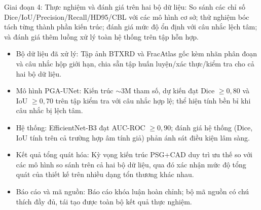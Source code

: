 Giai đoạn 4: Thực nghiệm và đánh giá trên hai bộ dữ liệu: So sánh các chỉ số Dice/IoU/Precision/Recall/HD95/CBL với các mô hình cơ sở; thử nghiệm bóc tách từng thành phần kiến trúc; đánh giá mức độ ổn định với câu nhắc lệch tâm; và đánh giá thêm luồng xử lý toàn hệ thống trên tập hỗn hợp.

\medskip
{}

\medskip
\begin{itemize}
    \item Bộ dữ liệu đã xử lý: Tập ảnh BTXRD và FracAtlas gốc kèm nhãn phân đoạn và câu nhắc hộp giới hạn, chia sẵn tập huấn luyện/xác thực/kiểm tra cho cả hai bộ dữ liệu.
    \item Mô hình PGA-UNet: Kiến trúc $\sim$3M tham số, dự kiến đạt Dice $\geq 0{,}80$ và IoU $\geq 0{,}70$ trên tập kiểm tra với câu nhắc hợp lệ; thể hiện tính bền bỉ khi câu nhắc bị lệch tâm.
    \item Hệ thống: EfficientNet-B3 đạt AUC-ROC $\geq 0{,}90$; đánh giá hệ thống (Dice, IoU tính trên cả trường hợp âm tính giả) phản ánh sát điều kiện lâm sàng.
    \item Kết quả tổng quát hóa: Kỳ vọng kiến trúc PSG+CAD duy trì ưu thế so với các mô hình so sánh trên cả hai bộ dữ liệu, qua đó xác nhận mức độ tổng quát của thiết kế trên nhiều dạng tổn thương khác nhau.
    \item Báo cáo và mã nguồn: Báo cáo khóa luận hoàn chỉnh; bộ mã nguồn có chú thích đầy đủ, tái tạo được toàn bộ kết quả thực nghiệm.
\end{itemize}

\medskip
{}

\medskip
\begin{table}[H]
\renewcommand{\arraystretch}{1.4}
\end{table}


